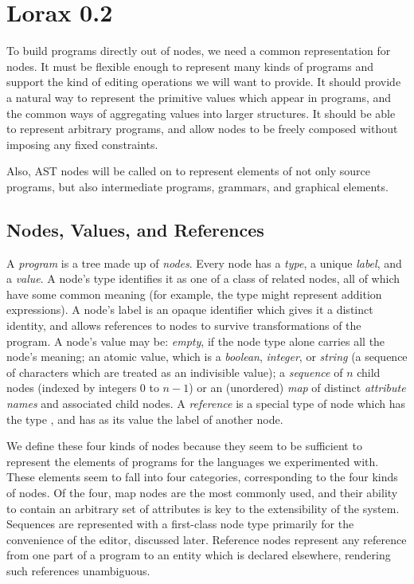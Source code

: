 \section{Lorax 0.2}
\label{lorax}
To build programs directly out of nodes, we need a common representation for nodes. It must be flexible enough to represent many kinds of programs and support the kind of editing operations we will want to provide. It should provide a natural way to represent the primitive values which appear in programs, and the common ways of aggregating values into larger structures. It should be able to represent arbitrary programs, and allow nodes to be freely composed without imposing any fixed constraints.

Also, AST nodes will be called on to represent elements of not only source programs, but also intermediate programs, grammars, and graphical elements.

\subsection{Nodes, Values, and References}
A \emph{program} is a tree made up of \emph{nodes}. Every node has a \emph{type}, a unique \emph{label}, and a \emph{value}. A node's type identifies it as one of a class of related nodes, all of which have some common meaning (for example, the type  might represent addition expressions). A node's label is an opaque identifier which gives it a distinct identity, and allows references to nodes to survive transformations of the program. A node's value may be: \emph{empty}, if the node type alone carries all the node's meaning; an atomic value, which is a \emph{boolean}, \emph{integer}, or \emph{string} (a sequence of characters which are treated as an indivisible value); a \emph{sequence} of $n$ child nodes (indexed by integers $0$ to $n-1$) or an (unordered) \emph{map} of distinct \emph{attribute names} and associated child nodes. A \emph{reference} is a special type of node which has the type , and has as its value the label of another node.

We define these four kinds of nodes because they seem to be sufficient to represent the elements of programs for the languages we experimented with. These elements seem to fall into four categories, corresponding to the four kinds of nodes. Of the four, map nodes are the most commonly used, and their ability to contain an arbitrary set of attributes is key to the extensibility of the system. Sequences are represented with a first-class node type primarily for the convenience of the editor, discussed later. Reference nodes represent any reference from one part of a program to an entity which is declared elsewhere, rendering such references unambiguous.

